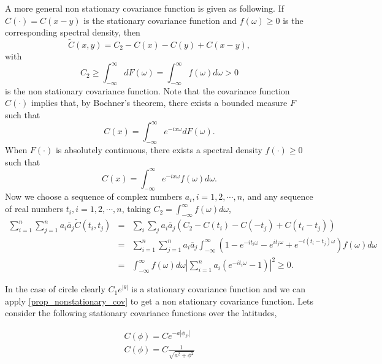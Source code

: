  \begin{prop} \label{prop_nonstationary_cov}
		      	A more general non stationary covariance function is given as following. If $C(\cdot) = C(x-y)$ is the stationary covariance function and $f(\omega) \ge 0$ is the corresponding spectral density, then
		      	\[
		      		\tilde{C}(x, y) = C_2 - C(x) - C(y) + C(x-y), 
		      	\]
		      	with 
		      	\[
		      		C_2 \ge \int_{-\infty}^\infty dF(\omega) = \int_{-\infty}^\infty f(\omega)d\omega > 0
		      	\]
		      	is the non stationary covariance function. Note that the covariance function $C(\cdot)$ implies that, by Bochner's theorem, there exists a bounded measure $F$ such that
		      	\[
		      		C(x) = \int_{-\infty}^\infty e^{-ix\omega}dF(\omega).
		      	\]
		      	When $F(\cdot)$ is absolutely continuous, there exists a spectral density $f(\cdot) \ge 0$ such that
		      	\[
		      		C(x) = \int_{-\infty}^\infty e^{-ix\omega}f(\omega)d\omega.
		      	\]
		      	Now we choose a sequence of complex numbers $a_i, i = 1, 2, \cdots, n$, and any sequence of real numbers $t_i, i = 1, 2, \cdots, n$, taking $C_2 = \int_{-\infty}^\infty f(\omega)d\omega$,
		      	\begin{eqnarray*}
		      		\sum_{i=1}^n \sum_{j=1}^n a_i \overline{a}_j \tilde{C}(t_i, t_j) &=& \sum_i \sum_j a_i \overline{a}_j (C_2 - C(t_i) - C(-t_j) + C(t_i-t_j)) \\
		      		&=& \sum_{i=1}^n \sum_{j=1}^n a_i \overline{a}_j \int_{-\infty}^\infty(1-  e^{-it_i\omega} - e^{it_j\omega} + e^{-i(t_i-t_j)\omega})f(\omega)d\omega \\
		      		&=&\int_{-\infty}^\infty f(\omega)d\omega \left|\sum_{i=1}^n a_i(e^{-it_i\omega} - 1)\right|^2 \ge 0.
		      	\end{eqnarray*}
		      \end{prop}
		


In the case of circle clearly $C_1e^{|\theta|}$ is a stationary covariance function and we can apply \ref{prop_nonstationary_cov} to get a non stationary covariance function. Lets consider the following stationary covariance functions over the latitudes,
		      		
		      \begin{eqnarray*}
		      	C(\phi) = Ce^{-a|\phi_P|} \\
		      	C(\phi) = C\frac{1}{\sqrt{a^2+\phi^2}}
		      \end{eqnarray*}

